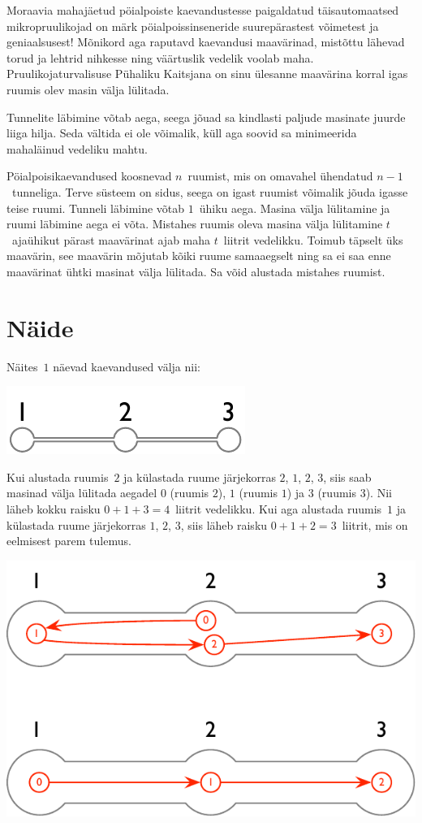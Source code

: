 
\noindent

Moraavia mahajäetud pöialpoiste kaevandustesse paigaldatud täisautomaatsed mikropruulikojad on märk
pöialpoissinseneride suurepärastest võimetest ja geniaalsusest!
Mõnikord aga raputavd kaevandusi maavärinad, mistõttu lähevad torud ja lehtrid nihkesse ning
väärtuslik vedelik voolab maha.
Pruulikojaturvalisuse Pühaliku Kaitsjana on sinu ülesanne maavärina korral igas ruumis olev masin
välja lülitada.

Tunnelite läbimine võtab aega,
seega jõuad sa kindlasti paljude masinate juurde liiga hilja.
Seda vältida ei ole võimalik, küll aga soovid sa minimeerida mahaläinud vedeliku mahtu.

\medskip
Pöialpoisikaevandused koosnevad $n$~ruumist, mis on omavahel ühendatud $n-1$~tunneliga.
Terve süsteem on sidus, seega on igast ruumist võimalik jõuda igasse teise ruumi.
Tunneli läbimine võtab $1$~ühiku aega.
Masina välja lülitamine ja ruumi läbimine aega ei võta.
Mistahes ruumis oleva masina välja lülitamine $t$~ajaühikut pärast maavärinat ajab maha $t$~liitrit
vedelikku.
Toimub täpselt üks maavärin, see maavärin mõjutab kõiki ruume samaaegselt ning sa ei saa enne
maavärinat ühtki masinat välja lülitada.
Sa võid alustada mistahes ruumist.

\section*{Näide}

Näites~$1$ näevad kaevandused välja nii:

\includegraphics[width=.2\textwidth]{img/sample-1.pdf}

Kui alustada ruumis~$2$ ja külastada ruume järjekorras $2$, $1$, $2$, $3$, siis saab masinad välja
lülitada aegadel $0$ (ruumis $2$), $1$ (ruumis $1$) ja $3$ (ruumis $3$). Nii läheb kokku raisku
$0+1+3=4$~liitrit vedelikku.
Kui aga alustada ruumis~$1$ ja külastada ruume järjekorras $1$, $2$, $3$, siis läheb raisku
$0+1+2=3$~liitrit, mis on eelmisest parem tulemus.

\includegraphics[width=.4\textwidth]{img/sample-1-ans.pdf}

